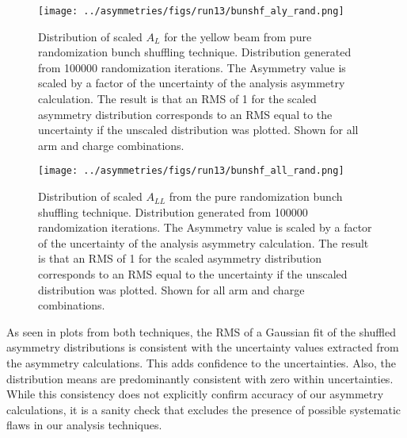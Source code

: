 \begin{figure}\label{fig:bnshf_rand_aly}
\texttt{[image: ../asymmetries/figs/run13/bunshf\_aly\_rand.png]}
\caption{Distribution of scaled $A_{L}$ for the yellow beam from pure randomization bunch shuffling technique. Distribution generated from 100000
randomization iterations. The Asymmetry value is scaled by a factor of the uncertainty of the analysis asymmetry calculation. The result is that
an RMS of 1 for the scaled asymmetry distribution corresponds to an RMS equal to the uncertainty if the unscaled distribution was plotted. Shown
for all arm and charge combinations.}
\end{figure}

\begin{figure}\label{fig:bnshf_rand_all}
\texttt{[image: ../asymmetries/figs/run13/bunshf\_all\_rand.png]}
\caption{Distribution of scaled $A_{LL}$ from the pure randomization bunch shuffling technique. Distribution generated from 100000
randomization iterations. The Asymmetry value is scaled by a factor of the uncertainty of the analysis asymmetry calculation. The result is that
an RMS of 1 for the scaled asymmetry distribution corresponds to an RMS equal to the uncertainty if the unscaled distribution was plotted. Shown
for all arm and charge combinations.}
\end{figure}

As seen in plots from both techniques, the RMS of a Gaussian fit of the shuffled asymmetry distributions is consistent with the uncertainty 
values extracted from the asymmetry calculations. This adds confidence to the uncertainties. Also, the distribution means are predominantly 
consistent with zero within uncertainties. While this consistency does not explicitly confirm accuracy of our asymmetry calculations, it 
is a sanity check that excludes the presence of possible systematic flaws in our analysis techniques.


